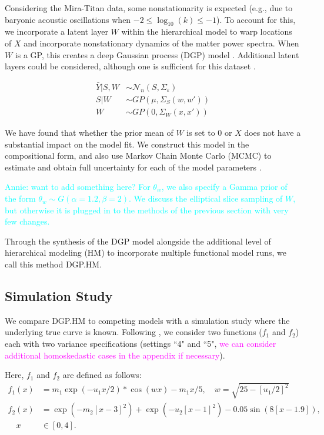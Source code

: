 \documentclass[11pt]{article}
\begin{document}
Considering the Mira-Titan data, some nonstationarity is expected (e.g., due to baryonic acoustic oscillations when $-2 \leq \log_{10}(k) \leq -1$). To account for this, we incorporate a latent layer $W$ within the hierarchical model to warp locations of $X$ and incorporate nonstationary dynamics of the matter power spectra. When $W$ is a GP, this creates a deep Gaussian process (DGP) model \citep{damianou2013deep}. Additional latent layers could be considered, although one is sufficient for this dataset \citep{dunlop2018deep}.

\begin{align}
\bar Y|S,W &\sim \mathcal{N}_n(S,\Sigma_\varepsilon) \\
S|W &\sim GP\left(\mu, \Sigma_S(w,w')\right) \\
W &\sim GP\left(0, \Sigma_W(x,x')\right)
\end{align}

We have found that whether the prior mean of $W$ is set to 0 or $X$ \citep[which would indicate stationarity apriori,][]{schmidt2003bayesian} does not have a substantial impact on the model fit. We construct this model in the compositional form, and also use Markov Chain Monte Carlo (MCMC) to estimate and obtain full uncertainty for each of the model parameters \citep{sauer2023active}.

\textcolor{cyan}{Annie: want to add something here? For $\theta_w$, we also specify a Gamma prior of the form $\theta_w \sim G(\alpha=1.2, \beta=2)$. We discuss the elliptical slice sampling of $W$, but otherwise it is plugged in to the methods of the previous section with very few changes.}

Through the synthesis of the DGP model alongside the additional level of hierarchical modeling (HM) to incorporate multiple functional model runs, we call this method DGP.HM.

\subsection{Simulation Study}
\label{subsec:sim}

We compare DGP.HM to competing models with a simulation study where the underlying true curve is known. Following \cite{moran2024dpc}, we consider two functions ($f_1$ and $f_2$) each with two variance specifications (settings ``4" and ``5", \textcolor{magenta}{we can consider additional homoskedastic cases in the appendix if necessary}). 

Here, $f_1$ and $f_2$ are defined as follows:
\begin{align}
  f_1(x) &= m_1 \exp(-u_1x/2) * \cos(wx) - m_1x/5, \quad w=\sqrt{25-[u_1/2]^2} \\
  f_2(x) &= \exp(-m_2[x-3]^2)+\exp(-u_2[x-1]^2)-0.05\sin(8[x-1.9]), \\ 
  \quad x &\in [0,4].
\end{align}
\end{document}
